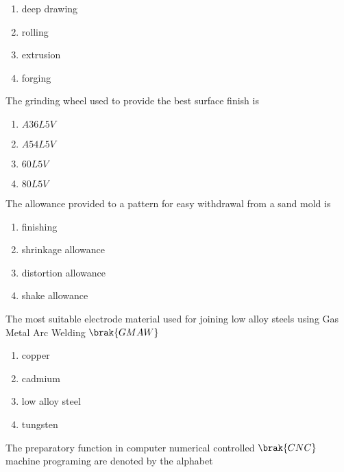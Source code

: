 \begin{enumerate}
    \item deep drawing\\
    \item rolling\\
    \item extrusion\\
    \item forging
\end{enumerate}
\item The grinding wheel used to provide the best surface finish is\\
\begin{enumerate}
   \item $A36L5V$\\
    \item $A54L5V$\\
    \item $60L5V$\\
   \item $80L5V$
\end{enumerate}
\item The allowance provided to a pattern for easy withdrawal from a sand mold is\\
\begin{enumerate}
    \item finishing\\
    \item shrinkage allowance\\
    \item distortion allowance\\
    \item shake allowance   
\end{enumerate}
   \item The most suitable electrode material used for joining low alloy steels using Gas Metal Arc Welding $\brak{GMAW}$\\
 \begin{enumerate}
   \item copper\\
   \item cadmium\\
   \item low alloy steel\\
   \item tungsten
 \end{enumerate}
 \item The preparatory function in computer numerical controlled $\brak{CNC}$ machine programing are denoted by the alphabet\\

